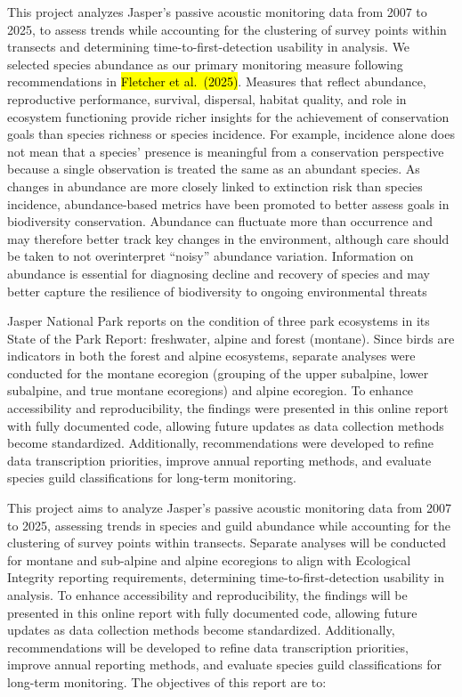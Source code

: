 \documentclass[
  letterpaper,
  DIV=11,
  numbers=noendperiod]{scrartcl}
\begin{document}
This project analyzes Jasper's passive acoustic monitoring data from
2007 to 2025, to assess trends while accounting for the clustering of
survey points within transects and determining time-to-first-detection
usability in analysis. We selected species abundance as our primary
monitoring measure following recommendations in \hl{Fletcher et
al.~(2025)}. Measures that reflect abundance, reproductive performance,
survival, dispersal, habitat quality, and role in ecosystem functioning
provide richer insights for the achievement of conservation goals than
species richness or species incidence. For example, incidence alone does
not mean that a species' presence is meaningful from a conservation
perspective because a single observation is treated the same as an
abundant species. As changes in abundance are more closely linked to
extinction risk than species incidence, abundance-based metrics have
been promoted to better assess goals in biodiversity conservation.
Abundance can fluctuate more than occurrence and may therefore better
track key changes in the environment, although care should be taken to
not overinterpret ``noisy'' abundance variation. Information on
abundance is essential for diagnosing decline and recovery of species
and may better capture the resilience of biodiversity to ongoing
environmental threats

Jasper National Park reports on the condition of three park ecosystems
in its State of the Park Report: freshwater, alpine and forest
(montane). Since birds are indicators in both the forest and alpine
ecosystems, separate analyses were conducted for the montane ecoregion
(grouping of the upper subalpine, lower subalpine, and true montane
ecoregions) and alpine ecoregion. To enhance accessibility and
reproducibility, the findings were presented in this online report with
fully documented code, allowing future updates as data collection
methods become standardized. Additionally, recommendations were
developed to refine data transcription priorities, improve annual
reporting methods, and evaluate species guild classifications for
long-term monitoring.

This project aims to analyze Jasper's passive acoustic monitoring data
from 2007 to 2025, assessing trends in species and guild abundance while
accounting for the clustering of survey points within transects.
Separate analyses will be conducted for montane and sub-alpine and
alpine ecoregions to align with Ecological Integrity reporting
requirements, determining time-to-first-detection usability in analysis.
To enhance accessibility and reproducibility, the findings will be
presented in this online report with fully documented code, allowing
future updates as data collection methods become standardized.
Additionally, recommendations will be developed to refine data
transcription priorities, improve annual reporting methods, and evaluate
species guild classifications for long-term monitoring. The objectives
of this report are to:
\end{document}
